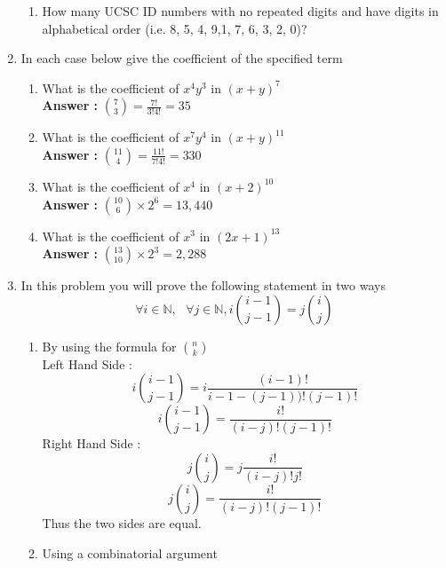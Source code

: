 \documentclass[a4paper,11pt]{article}
\newcommand{\answer}{\textbf{Answer : }}
\begin{document}
\begin{enumerate}
\begin{enumerate}
  \item How many UCSC ID numbers with no repeated digits and have digits in alphabetical order (i.e.
8, 5, 4, 9,1, 7, 6, 3, 2, 0)?

  \end{enumerate}


\item In each case below give the coefficient of the specified term 
  \begin{enumerate}
  \item What is the coefficient of $x^4y^3$ in $(x+y)^7$ \\
  \answer ${7 \choose 3} = \frac{7!}{3!4!} = 35$

  \item What is the coefficient of $x^7y^4$ in $(x+y)^{11}$ \\
  \answer ${11 \choose 4} = \frac{11!}{7!4!} = 330$

  \item What is the coefficient of $x^4$ in $(x+2)^{10}$ \\
  \answer ${10 \choose 6} \times 2^6 = 13,440$

  \item What is the coefficient of $x^3$ in $(2x+1)^{13}$ \\
  \answer ${13 \choose 10}\times 2^3 = 2,288$
  \end{enumerate}



\item In this problem you will prove the following statement in two ways 
\[ \forall i \in \mathbb{N}, \text{ } \forall j \in \mathbb{N}, i{i-1 \choose j-1} = j{i \choose j} \]
  \begin{enumerate}
  \item By using the formula for ${n \choose k}$ \\
  Left Hand Side :
  \[ i{i-1 \choose j-1} = i\frac{(i-1)!}{i-1-(j-1))!(j-1)!} \]
  \[ i{i-1 \choose j-1} = \frac{i!}{(i-j)!(j-1)!} \]
  Right Hand Side :
  \[ j{i\choose j} = j\frac{i!}{(i-j)!j!} \]
  \[ j{i\choose j} = \frac{i!}{(i-j)!(j-1)!} \]
  Thus the two sides are equal.

  \item Using a combinatorial argument
  \end{enumerate}



\end{enumerate}
\end{document}

